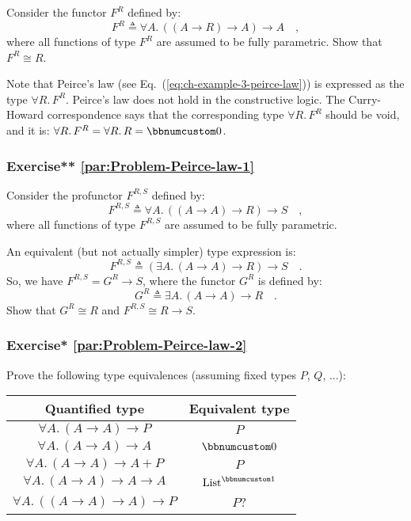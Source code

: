 Consider the functor $F^{R}$ defined by:
\[
F^{R}\triangleq\forall A.\,((A\rightarrow R)\rightarrow A)\rightarrow A\quad,
\]
where all functions of type $F^{R}$ are assumed to be fully parametric.
Show that $F^{R}\cong R$.

Note that Peirce\textsf{'}s law (see Eq.~(\ref{eq:ch-example-3-peirce-law}))
is expressed as the type $\forall R.\,F^{R}$. Peirce\textsf{'}s law does not
hold in the constructive logic. The Curry-Howard correspondence says
that the corresponding type $\forall R.\,F^{R}$ should be void, and
it is: $\forall R.\,F^{R}=\forall R.\,R=\bbnum 0$. 


\subsubsection{Exercise{*}{*} \label{par:Problem-Peirce-law-1}\ref{par:Problem-Peirce-law-1}}

Consider the profunctor $F^{R,S}$ defined by:
\[
F^{R,S}\triangleq\forall A.\,((A\rightarrow A)\rightarrow R)\rightarrow S\quad,
\]
where all functions of type $F^{R,S}$ are assumed to be fully parametric. 

An equivalent (but not actually simpler) type expression is:
\[
F^{R,S}\triangleq(\exists A.\,(A\rightarrow A)\rightarrow R)\rightarrow S\quad.
\]
So, we have $F^{R,S}=G^{R}\rightarrow S$, where the functor $G^{R}$
is defined by:
\[
G^{R}\triangleq\exists A.\,(A\rightarrow A)\rightarrow R\quad.
\]
Show that $G^{R}\cong R$ and $F^{R,S}\cong R\rightarrow S$.


\subsubsection{Exercise{*} \label{par:Problem-Peirce-law-2}\ref{par:Problem-Peirce-law-2}}

Prove the following type equivalences (assuming fixed types $P$,
$Q$, ...):

\begin{tabular}{|c|c|}
\hline 
\textbf{\footnotesize{}Quantified type} & \textbf{\footnotesize{}Equivalent type}\tabularnewline
\hline 
\hline 
$\forall A.\,(A\rightarrow A)\rightarrow P$ & $P$\tabularnewline
\hline 
$\forall A.\,(A\rightarrow A)\rightarrow A$ & $\bbnum 0$\tabularnewline
\hline 
$\forall A.\,(A\rightarrow A)\rightarrow A+P$ & $P$\tabularnewline
\hline 
$\forall A.\,(A\rightarrow A)\rightarrow A\rightarrow A$ & $\text{List}^{\bbnum 1}$\tabularnewline
\hline 
$\forall A.\,((A\rightarrow A)\rightarrow A)\rightarrow P$ & $P$?\tabularnewline
\hline 
\end{tabular}

